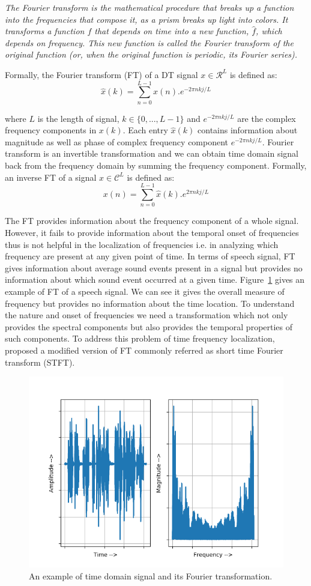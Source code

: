 \emph{The Fourier transform is the mathematical procedure that breaks up a function into the frequencies that
compose it, as a prism breaks up light into colors. It transforms a function $f$ that depends on time into a
new function, $\hat{f}$, which depends on frequency. This new function is called the Fourier transform of the
original function (or, when the original function is periodic, its Fourier series).}

Formally, the Fourier transform (FT) of a DT signal $x\in \mathcal{R}^{L}$ is defined as:
\begin{equation}
    \hat{x}(k) = \sum_{n=0}^{L-1}  x(n).e^{-2\pi nkj/L}
\end{equation}

where $L$ is the length of signal, $k\in\{0,...,L-1\}$ and $e^{-2\pi nkj/L}$ are the complex frequency components in $x(k)$.
Each entry $\hat{x}(k)$ contains information about magnitude as well as phase of complex frequency component $e^{-2\pi nkj/L}$. Fourier transform is an invertible transformation and we can obtain time domain signal back from the frequency domain by summing the frequency component. Formally, an inverse FT of a signal $x\in \mathcal{C}^{L}$ is defined as:
\begin{equation}
    x(n) = \sum_{n=0}^{L-1}  \hat{x}(k).e^{2\pi nkj/L}
\end{equation}

The FT provides information about the frequency component of a whole signal. However, it fails to provide information about the temporal onset of frequencies thus is not helpful in the localization of frequencies i.e. in analyzing which frequency are present at any given point of time. In terms of speech signal, FT gives information about average sound events present in a signal but provides no information about which sound event occurred at a given time. Figure~\ref{fig:speech_ex} gives an example of FT of a speech signal. We can see it gives the overall measure of frequency but provides no information about the time location. To understand the nature and onset of frequencies we need a transformation which not only provides the spectral components but also provides the temporal properties of such components. To address this problem of time frequency localization, ~\cite{gabor1946theory} proposed a modified version of FT commonly referred as short time Fourier transform (STFT).

\begin{figure}
    \centering
    \includegraphics[width=0.75\columnwidth, height=0.40\columnwidth]{master_thesis_template/figs/fft.png}
    \caption{An example of time domain signal and its Fourier transformation.}
    \label{fig:speech_ex}
\end{figure}

